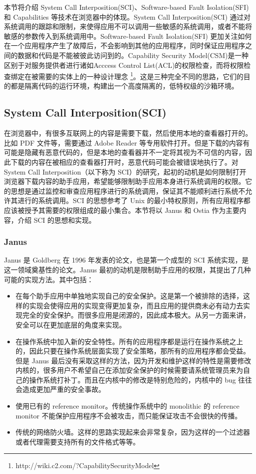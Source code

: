 \documentclass[final,12pt]{elsarticle}
\begin{document}
本节将介绍 System Call Interposition(SCI)、Software-based Fault Isolation(SFI) 和 Capabilities 等技术在浏览器中的体现。System Call Interposition(SCI) 通过对系统调用的跟踪和限制，来使得应用不可以调用一些敏感的系统调用，或者不能将敏感的参数传入到系统调用中。Software-based Fault Isolation(SFI) 更加关注如何在一个应用程序产生了故障后，不会影响到其他的应用程序，同时保证应用程序之间的数据和代码是不能被彼此访问到的。Capability Security Model(CSM)是一种区别于对服务提供者进行诸如Acccess Control List(ACL)的权限检查，而将权限检查绑定在被需要的实体上的一种设计理念 \footnote{http://wiki.c2.com/?CapabilitySecurityModel}。这是三种完全不同的思路，它们的目的都是隔离代码的运行环境，构建出一个高度隔离的，低特权级的沙箱环境。

\subsection{System Call Interposition(SCI)}
\label{ss:sci}

在浏览器中，有很多互联网上的内容是需要下载，然后使用本地的查看器打开的。比如 PDF 文件等，需要通过 Adobe Reader 等专用软件打开。但是下载的内容有可能是隐藏有恶意代码的，但是本地的查看器并不一定将其视为不可信的内容，因此下载的内容在被相应的查看器打开时，恶意代码可能会被错误地执行了。对 System Call Interposition（以下称为 SCI）的研究，起初的动机是如何限制打开浏览器下载内容的助手应用，希望能够限制助手应用本身进行系统调用的权限。它的思想是通过监控和审查应用程序进行的系统调用，保证其不能顺利进行系统不允许其进行的系统调用。SCI 的思想参考了 Unix 的最小特权原则，所有应用程序都应该被授予其需要的权限组成的最小集合。本节将以 Janus 和 Ostia 作为主要内容，介绍 SCI 的思想和实现。

\subsubsection{Janus}
\label{sss:janus}

Janus \cite{goldberg} 是 Goldberg 在 1996 年发表的论文，也是第一个成型的 SCI 系统实现，是这一领域奠基性的论文。Janus 最初的动机是限制助手应用的权限，其提出了几种可能的实现方法。其中包括：

\begin{itemize}
\item
在每个助手应用中单独地实现自己的安全保护。这是第一个被排除的选择，这样的实现会使得应用的实现变得更加复杂，而且应用的提供商未必有动力去实现完全的安全保护。而很多应用是闭源的，因此成本极大。从另一方面来讲，安全可以在更加底层的角度来实现。
\item
在操作系统中加入新的安全特性。所有的应用程序都是运行在操作系统之上的，因此只要在操作系统层面实现了安全策略，那所有的应用程序都会受益。但是 Janus 最后没有采取这样的方法，因为开发和维护这样的特性是需要修改内核的，很多用户不希望自己在添加安全保护的时候需要请系统管理员来为自己的操作系统打补丁。而且在内核中的修改是特别危险的，内核中的 bug 往往会造成更加严重的安全事故。
\item
使用已有的 reference monitor。传统操作系统中的 monolithic 的 reference monitor 不能保护应用程序不会被攻击，而只能保证攻击不会很快的传播。
\item
传统的网络防火墙。这样的思路实现起来会非常复杂，因为这样的一个过滤器或者代理需要支持所有的文件格式等等。
\end{itemize}
\end{document}
